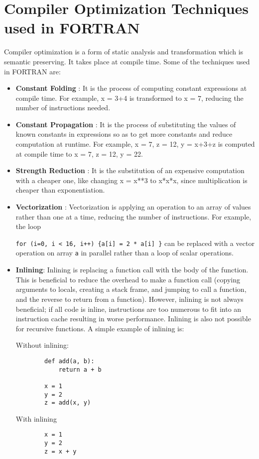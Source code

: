 \documentclass[twoside]{article}
\begin{document}
\section{Compiler Optimization Techniques used in FORTRAN}
Compiler optimization is a form of static analysis and transformation which is semantic preserving. It takes place at compile time. Some of the techniques used in FORTRAN are:
\begin{itemize}
    \item \textbf{Constant Folding} : It is the process of computing constant expressions at compile time. For example, x = 3+4 is transformed to x = 7, reducing the number of instructions needed.
    \item \textbf{Constant Propagation} : It is the process of substituting the values of known constants in expressions so as to get more constants and reduce computation at runtime. For example, x = 7, z = 12, y = x+3+z is computed at compile time to x = 7, z = 12, y = 22.
    \item \textbf{Strength Reduction} :  It is the substitution of an expensive computation with a cheaper one, like changing x = x**3 to x*x*x, since multiplication is cheaper than exponentiation.
    \item \textbf{Vectorization} : Vectorization is applying an operation to an array of values rather than one at a time, reducing the number of instructions. For example, the loop 
    
    \texttt{for (i=0, i < 16, i++) \{a[i] = 2 * a[i] \}} can be replaced with a vector operation on array \texttt{a} in parallel rather than a loop of scalar operations. 
    \item \textbf{Inlining}: Inlining is replacing a function call with the body of the function. This is beneficial to reduce the overhead to make a function call (copying arguments to locals, creating a stack frame, and jumping to call a function, and the reverse to return from a function). However, inlining is not always beneficial; if all code is inline, instructions are too numerous to fit into an instruction cache resulting in worse performance. Inlining is also not possible for recursive functions. A simple example of inlining is:
    
Without inlining:
    \begin{verbatim}         
        def add(a, b):     
            return a + b

        x = 1 
        y = 2
        z = add(x, y)        
    \end{verbatim} 
With inlining
    \begin{verbatim}         
        x = 1 
        y = 2
        z = x + y
    \end{verbatim} 
    
\end{itemize}
\end{document}
